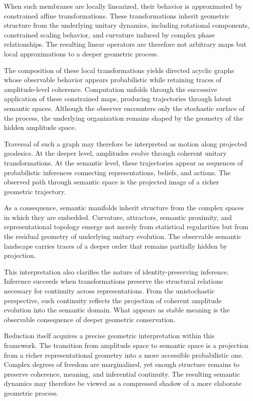\documentclass[12pt,letterpaper]{article}
\theoremstyle{remark}
\begin{document}
When such membranes are locally linearized, their behavior is approximated by constrained affine transformations. These transformations inherit geometric structure from the underlying unitary dynamics, including rotational components, constrained scaling behavior, and curvature induced by complex phase relationships. The resulting linear operators are therefore not arbitrary maps but local approximations to a deeper geometric process.

The composition of these local transformations yields directed acyclic graphs whose observable behavior appears probabilistic while retaining traces of amplitude-level coherence. Computation unfolds through the successive application of these constrained maps, producing trajectories through latent semantic spaces. Although the observer encounters only the stochastic surface of the process, the underlying organization remains shaped by the geometry of the hidden amplitude space.

Traversal of such a graph may therefore be interpreted as motion along projected geodesics. At the deeper level, amplitudes evolve through coherent unitary transformations. At the semantic level, these trajectories appear as sequences of probabilistic inferences connecting representations, beliefs, and actions. The observed path through semantic space is the projected image of a richer geometric trajectory.

As a consequence, semantic manifolds inherit structure from the complex spaces in which they are embedded. Curvature, attractors, semantic proximity, and representational topology emerge not merely from statistical regularities but from the residual geometry of underlying unitary evolution. The observable semantic landscape carries traces of a deeper order that remains partially hidden by projection.

This interpretation also clarifies the nature of identity-preserving inference. Inference succeeds when transformations preserve the structural relations necessary for continuity across representations. From the unistochastic perspective, such continuity reflects the projection of coherent amplitude evolution into the semantic domain. What appears as stable meaning is the observable consequence of deeper geometric conservation.

Reduction itself acquires a precise geometric interpretation within this framework. The transition from amplitude space to semantic space is a projection from a richer representational geometry into a more accessible probabilistic one. Complex degrees of freedom are marginalized, yet enough structure remains to preserve coherence, meaning, and inferential continuity. The resulting semantic dynamics may therefore be viewed as a compressed shadow of a more elaborate geometric process.
\end{document}
